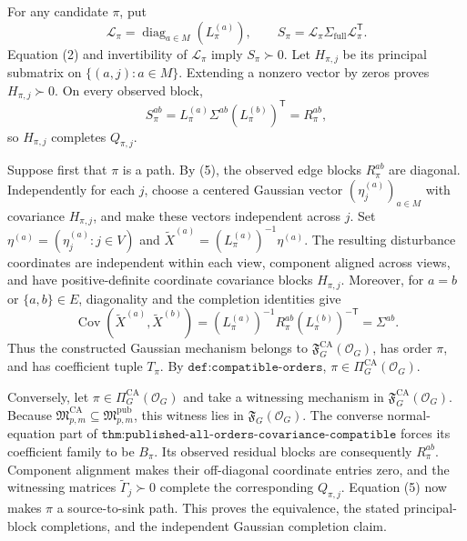 For any candidate \(\pi\), put
\[
 \mathcal L_\pi=\operatorname{diag}_{a\in M}(L_\pi^{(a)}),
 \qquad S_\pi=\mathcal L_\pi\Sigma_{\mathrm{full}}
 \mathcal L_\pi^{\mathsf T}.
\]
Equation (2) and invertibility of \(\mathcal L_\pi\) imply \(S_\pi\succ0\).  Let \(H_{\pi,j}\) be its principal submatrix on \(\{(a,j):a\in M\}\).  Extending a nonzero vector by zeros proves \(H_{\pi,j}\succ0\).  On every observed block,
\[
 S_\pi^{ab}=L_\pi^{(a)}\Sigma^{ab}(L_\pi^{(b)})^{\mathsf T}=R_\pi^{ab},
\]
so \(H_{\pi,j}\) completes \(Q_{\pi,j}\).

Suppose first that \(\pi\) is a path.  By (5), the observed edge blocks \(R_\pi^{ab}\) are diagonal.  Independently for each \(j\), choose a centered Gaussian vector \((\eta_j^{(a)})_{a\in M}\) with covariance \(H_{\pi,j}\), and make these vectors independent across \(j\).  Set \(\eta^{(a)}=(\eta_j^{(a)}:j\in V)\) and \(\widetilde X^{(a)}=(L_\pi^{(a)})^{-1}\eta^{(a)}\).  The resulting disturbance coordinates are independent within each view, component aligned across views, and have positive-definite coordinate covariance blocks \(H_{\pi,j}\).  Moreover, for \(a=b\) or \(\{a,b\}\in E\), diagonality and the completion identities give
\[
 \operatorname{Cov}(\widetilde X^{(a)},\widetilde X^{(b)})
 =(L_\pi^{(a)})^{-1}R_\pi^{ab}(L_\pi^{(b)})^{-\mathsf T}
 =\Sigma^{ab}.
 \tag{6}
\]
Thus the constructed Gaussian mechanism belongs to \(\mathfrak F_G^{\mathrm{CA}}(\mathcal O_G)\), has order \(\pi\), and has coefficient tuple \(T_\pi\).  By \(\texttt{def:compatible-orders}\), \(\pi\in\Pi_G^{\mathrm{CA}}(\mathcal O_G)\).

Conversely, let \(\pi\in\Pi_G^{\mathrm{CA}}(\mathcal O_G)\) and take a witnessing mechanism in \(\mathfrak F_G^{\mathrm{CA}}(\mathcal O_G)\).  Because \(\mathfrak M_{p,m}^{\mathrm{CA}}\subseteq\mathfrak M_{p,m}^{\mathrm{pub}}\), this witness lies in \(\mathfrak F_G(\mathcal O_G)\).  The converse normal-equation part of \(\texttt{thm:published-all-orders-covariance-compatible}\) forces its coefficient family to be \(B_\pi\).  Its observed residual blocks are consequently \(R_\pi^{ab}\).  Component alignment makes their off-diagonal coordinate entries zero, and the witnessing matrices \(\widetilde\Gamma_j\succ0\) complete the corresponding \(Q_{\pi,j}\).  Equation (5) now makes \(\pi\) a source-to-sink path.  This proves the equivalence, the stated principal-block completions, and the independent Gaussian completion claim.

